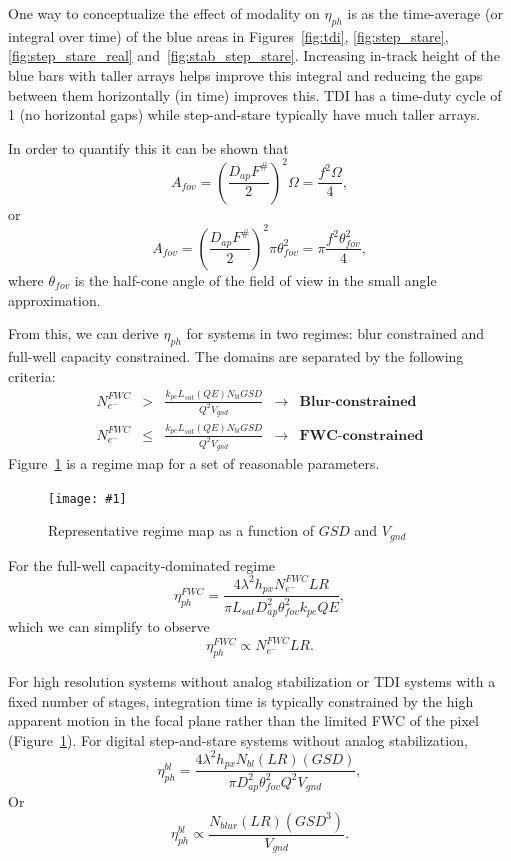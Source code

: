 \documentclass[10pt,journal]{IEEEtran}  %
\newcommand{\includefigure}[3]
{
  \begin{figure}[h!]
  \centering
  \texttt{[image: \#1]}
  \caption[]{#3}
  \label{#2}
  \end{figure}
}
\begin{document}
One way to conceptualize the effect of modality on $\eta_{ph}$ is as the time-average (or integral over time) of the blue areas in Figures~\ref{fig:tdi}, \ref{fig:step_stare}, \ref{fig:step_stare_real} and~\ref{fig:stab_step_stare}.  Increasing in-track height of the blue bars with taller arrays helps improve this integral and reducing the gaps between them horizontally (in time) improves this.  TDI has a time-duty cycle of 1 (no horizontal gaps) while step-and-stare typically have much taller arrays.

In order to quantify this it can be shown that
\begin{equation*}
    A_{fov} = \left(\frac{D_{ap}F^\#}{2}\right)^2 \Omega = \frac{f^2 \Omega}{4} ,
\end{equation*}
or 
\begin{equation}
\label{eq:A_fov}
A_{fov} = \left(\frac{D_{ap}F^\#}{2}\right)^2 \pi \theta_{fov}^2 = \pi \frac{f^2 \theta_{fov}^2}{4},
\end{equation}
where $\theta_{fov}$ is the half-cone angle of the field of view in the small angle approximation.

From this, we can derive $\eta_{ph}$ for systems in two regimes: blur constrained and full-well capacity constrained.  The domains are separated by the following criteria:
\begin{align*}
    N_{e^-}^{FWC} &>& \frac{k_{pe}L_{sat}(QE) N_{bl} GSD}{Q^2 V_{gnd}} & \rightarrow &  \textbf{Blur-constrained} \\
    N_{e^-}^{FWC} &\leq& \frac{k_{pe}L_{sat}(QE) N_{bl} GSD}{Q^2 V_{gnd}} & \rightarrow &  \textbf{FWC-constrained}
\end{align*}
Figure~\ref{fig:eta_regime} is a regime map for a set of reasonable parameters.

\includefigure{figures/blur_fwc_regime.pgf}{fig:eta_regime}{Representative regime map as a function of $GSD$ and $V_{gnd}$}

For the full-well capacity-dominated regime
\begin{equation}
    \label{eq:eta_ph_fwc}
    \eta_{ph}^{FWC} = \frac{4\lambda^2 h_{px} N_{e^-}^{FWC} LR}{\pi L_{sat} D_{ap}^2 \theta_{fov}^2 k_{pe}QE},
\end{equation}
which we can simplify to observe
\begin{equation}
    \label{eq:eta_fwc_scaling}
    \eta_{ph}^{FWC} \propto N_{e^-}^{FWC} LR.
\end{equation}

For high resolution systems without analog stabilization or TDI systems with a fixed number of stages, integration time is typically constrained by the high apparent motion in the focal plane rather than the limited FWC of the pixel (Figure~\ref{fig:eta_regime}).  For digital step-and-stare systems without analog stabilization,
\begin{equation}
    \label{eq:eta_ph_blur}
    \eta_{ph}^{bl} = \frac{4\lambda^2 h_{px}N_{bl}(LR)(GSD)}{\pi D_{ap}^2\theta_{fov}^2 Q^2 V_{gnd}},
\end{equation}
Or 
\begin{equation}
    \label{eq:eta_blur_scaling}
    \eta_{ph}^{bl} \propto  \frac{N_{blur} (LR) (GSD^3)}{V_{gnd}}.
\end{equation}
\end{document}
